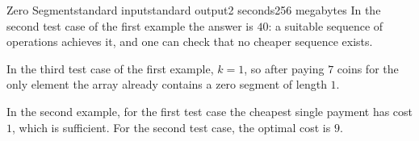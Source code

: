 \begin{problem}{Zero Segment}{standard input}{standard output}{2 seconds}{256 megabytes}
In the second test case of the first example the answer is $40$: a suitable sequence of operations achieves it, and one can check that no cheaper sequence exists.

In the third test case of the first example, $k = 1$, so after paying $7$ coins for the only element the array already contains a zero segment of length $1$.

In the second example, for the first test case the cheapest single payment has cost $1$, which is sufficient. For the second test case, the optimal cost is $9$.


\end{problem}

